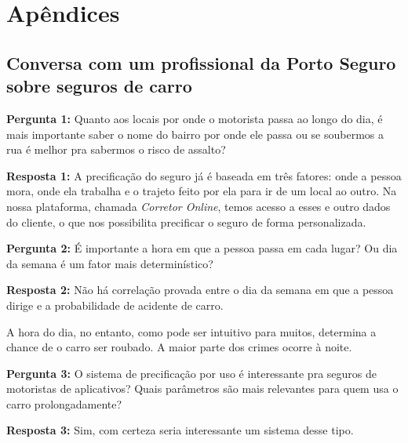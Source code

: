 \chapter{Apêndices}




\section{Conversa com um profissional da Porto Seguro sobre seguros de carro}


\textbf{Pergunta 1:} 
Quanto aos locais por onde o motorista passa ao longo do dia, é mais importante saber o nome do bairro por onde ele passa ou se soubermos a rua é melhor pra sabermos o risco de assalto?

\textbf{Resposta 1:} 
A precificação do seguro já é baseada em três fatores: onde a pessoa mora, onde ela trabalha e o trajeto feito por ela para ir de um local ao outro.
Na nossa plataforma, chamada \textit{Corretor Online}, temos acesso a esses e outro dados do cliente, o que nos possibilita precificar o seguro de forma personalizada.


\textbf{Pergunta 2:} 
É importante a hora em que a pessoa passa em cada lugar? Ou dia da semana é um fator mais determinístico?

\textbf{Resposta 2:}
Não há correlação provada entre o dia da semana em que a pessoa dirige e a probabilidade de acidente de carro.

A hora do dia, no entanto, como pode ser intuitivo para muitos, determina a chance de o carro ser roubado. A maior parte dos crimes ocorre à noite.





\textbf{Pergunta 3:} O sistema de precificação por uso é interessante pra seguros de motoristas de aplicativos? Quais parâmetros são mais relevantes para quem usa o carro prolongadamente?

\textbf{Resposta 3:}
Sim, com certeza seria interessante um sistema desse tipo.

